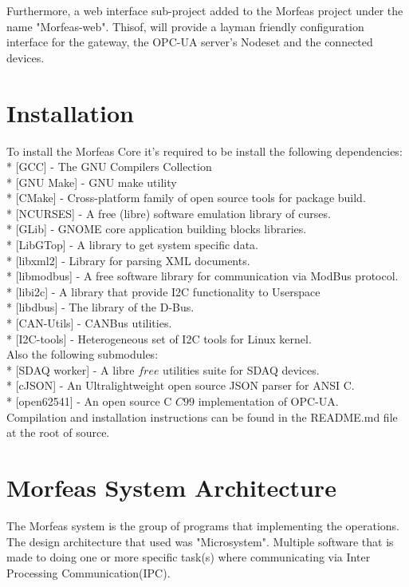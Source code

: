 \documentclass{article}
\begin{document}
Furthermore, a web interface sub-project added to the Morfeas project under the name "Morfeas-web".
Thisof, will provide a layman friendly configuration interface for the gateway, the OPC-UA server's Nodeset and the connected devices.

\section{Installation}
To install the Morfeas Core it's required to be install the following dependencies:\\
* [GCC] - The GNU Compilers Collection\\
* [GNU Make] - GNU make utility\\
* [CMake] - Cross-platform family of open source tools for package build.\\
* [NCURSES] - A free (libre) software emulation library of curses.\\
* [GLib] - GNOME core application building blocks libraries.\\
* [LibGTop] - A library to get system specific data.\\
* [libxml2] - Library for parsing XML documents.\\
* [libmodbus] - A free software library for communication via ModBus protocol.\\
* [libi2c] - A library that provide I2C functionality to Userspace\\
* [libdbus] - The library of the D-Bus.\\
* [CAN-Utils] - CANBus utilities.\\
* [I2C-tools] - Heterogeneous set of I2C tools for Linux kernel.\\
Also the following submodules:\\
* [SDAQ worker] - A libre \(free\) utilities suite for SDAQ devices.\\
* [cJSON] - An Ultralightweight open source JSON parser for ANSI C.\\
* [open62541] - An open source C \(C99\) implementation of OPC-UA.\\

Compilation and installation instructions can be found in the README.md file at the root of source.

\section{Morfeas System Architecture}
The Morfeas system is the group of programs that implementing the operations. The design architecture that used was "Microsystem".
Multiple software that is made to doing one or more specific task(s) where communicating via Inter Processing Communication(IPC).
\end{document}
